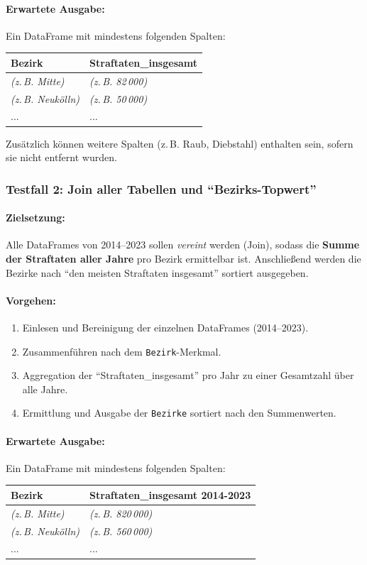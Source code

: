 \documentclass[11pt,a4paper]{article}
\begin{document}
\paragraph{Erwartete Ausgabe:}
Ein DataFrame mit mindestens folgenden Spalten:
\begin{center}
\begin{tabular}{l|l}
\textbf{Bezirk} & \textbf{Straftaten\_insgesamt} \\
\hline
\textit{(z.\,B. Mitte)} & \textit{(z.\,B. 82\,000)} \\
\textit{(z.\,B. Neukölln)} & \textit{(z.\,B. 50\,000)} \\
... & ...
\end{tabular}
\end{center}
Zusätzlich können weitere Spalten (z.\,B. Raub, Diebstahl) enthalten sein, sofern sie nicht entfernt wurden.

\subsubsection{Testfall 2: Join aller Tabellen und \enquote{Bezirks-Topwert}}
\paragraph{Zielsetzung:}
Alle DataFrames von 2014--2023 sollen \emph{vereint} werden (Join), sodass die \textbf{Summe der Straftaten aller Jahre} pro Bezirk ermittelbar ist. Anschließend werden die Bezirke nach \enquote{den meisten Straftaten insgesamt} sortiert ausgegeben.

\paragraph{Vorgehen:}
\begin{enumerate}
    \item Einlesen und Bereinigung der einzelnen DataFrames (2014--2023).
    \item Zusammenführen nach dem \texttt{Bezirk}-Merkmal.
    \item Aggregation der \enquote{Straftaten\_insgesamt} pro Jahr zu einer Gesamtzahl über alle Jahre.
    \item Ermittlung und Ausgabe der \texttt{Bezirke} sortiert nach den Summenwerten.
\end{enumerate}

\paragraph{Erwartete Ausgabe:}
Ein DataFrame mit mindestens folgenden Spalten:
\begin{center}
\begin{tabular}{l|l}
\textbf{Bezirk} & \textbf{Straftaten\_insgesamt 2014-2023} \\
\hline
\textit{(z.\,B. Mitte)} & \textit{(z.\,B. 820\,000)} \\
\textit{(z.\,B. Neukölln)} & \textit{(z.\,B. 560\,000)} \\
... & ...
\end{tabular}
\end{center}
\end{document}
